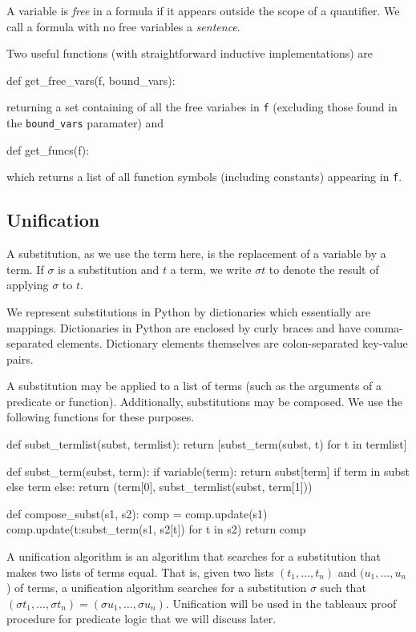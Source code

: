 \documentclass[a4paper,notitlepage]{scrartcl}
\begin{document}
A variable is \emph{free} in a formula if it appears outside the scope
   of a quantifier.
We call a formula with no free variables a \emph{sentence}.

Two useful functions (with straightforward inductive implementations) are
\begin{code}
def get_free_vars(f, bound_vars):
\end{code}
returning a set containing of all the free variabes in \texttt{f} (excluding those
   found in the \texttt{bound\_vars} paramater) and
\begin{code}
def get_funcs(f):
\end{code}
which returns a list of all function symbols (including constants) appearing
   in \texttt{f}.

\subsection{Unification}

A substitution, as we use the term here, is the replacement of a variable by a
term. If $\sigma$ is a substitution and $t$ a term, we write $\sigma t$ to
denote the result of applying $\sigma$ to $t$.

We represent substitutions in Python by dictionaries which essentially are
mappings. Dictionaries in Python are enclosed by curly braces and have
comma-separated elements. Dictionary elements themselves are colon-separated
key-value pairs.

A substitution may be applied to a list of terms (such as the arguments of a
predicate or function). Additionally, substitutions may be composed. We use the
following functions for these purposes.

\begin{code}
def subst_termlist(subst, termlist):
    return [subst_term(subst, t) for t in termlist]

def subst_term(subst, term):
    if variable(term):
        return subst[term] if term in subst else term
    else:
        return (term[0], subst_termlist(subst, term[1]))

def compose_subst(s1, s2):
    comp = {}
    comp.update(s1)
    comp.update({t:subst_term(s1, s2[t]) for t in s2})
    return comp
\end{code}

A unification algorithm is an algorithm that searches for a substitution that
makes two lists of terms equal. That is, given two lists $(t_1, \ldots, t_n)$
and $(u_1, \ldots, u_n$) of terms, a unification algorithm searches for a
substitution $\sigma$ such that $(\sigma t_1, \ldots, \sigma t_n) = (\sigma
u_1, \ldots, \sigma u_n)$. Unification will be used in the tableaux proof
procedure for predicate logic that we will discuss later.
\end{document}
